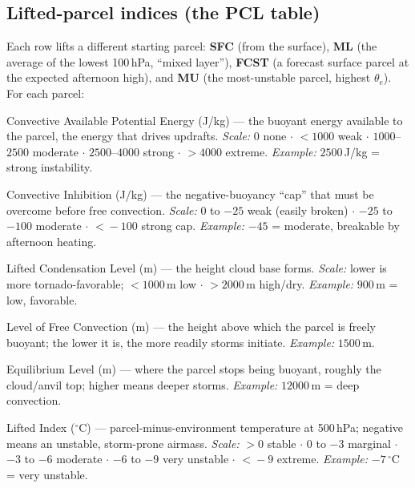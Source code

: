 \documentclass[11pt,openany]{report}
\begin{document}
\subsection{Lifted-parcel indices (the PCL table)}
Each row lifts a different starting parcel: \textbf{SFC} (from the surface),
\textbf{ML} (the average of the lowest 100\,hPa, ``mixed layer''), \textbf{FCST} (a
forecast surface parcel at the expected afternoon high), and \textbf{MU} (the
most-unstable parcel, highest $\theta_e$). For each parcel:
\begin{description}[leftmargin=2.2cm,style=nextline]
  \item[CAPE] Convective Available Potential Energy (J/kg) --- the buoyant energy available to the
        parcel, the energy that drives updrafts. \emph{Scale:} $0$ none $\cdot$ $<\!1000$ weak $\cdot$
        $1000$--$2500$ moderate $\cdot$ $2500$--$4000$ strong $\cdot$ $>\!4000$ extreme.
        \emph{Example:} $2500$\,J/kg = strong instability.
  \item[CINH] Convective Inhibition (J/kg) --- the negative-buoyancy ``cap'' that must be overcome
        before free convection. \emph{Scale:} $0$ to $-25$ weak (easily broken) $\cdot$ $-25$ to
        $-100$ moderate $\cdot$ $<\!-100$ strong cap. \emph{Example:} $-45$ = moderate, breakable
        by afternoon heating.
  \item[LCL] Lifted Condensation Level (m) --- the height cloud base forms. \emph{Scale:} lower is
        more tornado-favorable; $<\!1000$\,m low $\cdot$ $>\!2000$\,m high/dry.
        \emph{Example:} $900$\,m = low, favorable.
  \item[LFC] Level of Free Convection (m) --- the height above which the parcel is freely buoyant;
        the lower it is, the more readily storms initiate. \emph{Example:} $1500$\,m.
  \item[EL] Equilibrium Level (m) --- where the parcel stops being buoyant, roughly the cloud/anvil
        top; higher means deeper storms. \emph{Example:} $12000$\,m = deep convection.
  \item[LI] Lifted Index ($^\circ$C) --- parcel-minus-environment temperature at 500\,hPa; negative
        means an unstable, storm-prone airmass. \emph{Scale:} $>\!0$ stable $\cdot$ $0$ to $-3$
        marginal $\cdot$ $-3$ to $-6$ moderate $\cdot$ $-6$ to $-9$ very unstable $\cdot$ $<\!-9$
        extreme. \emph{Example:} $-7\,^\circ$C = very unstable.
\end{description}
\end{document}
